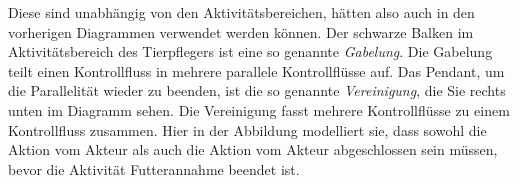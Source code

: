 Diese sind unabhängig von den Aktivitätsbereichen, hätten also auch in den vorherigen Diagrammen verwendet werden können. Der schwarze Balken im Aktivitätsbereich des Tierpflegers ist eine so genannte \textit{Gabelung}. Die Gabelung teilt einen Kontrollfluss in mehrere parallele Kontrollflüsse auf. Das Pendant, um die Parallelität wieder zu beenden, ist die so genannte \textit{Vereinigung}, die Sie rechts unten im Diagramm sehen. Die Vereinigung fasst mehrere Kontrollflüsse zu einem Kontrollfluss zusammen. Hier in der Abbildung modelliert sie, dass sowohl die Aktion  vom Akteur  als auch die Aktion  vom Akteur  abgeschlossen sein müssen, bevor die Aktivität Futterannahme beendet ist.


